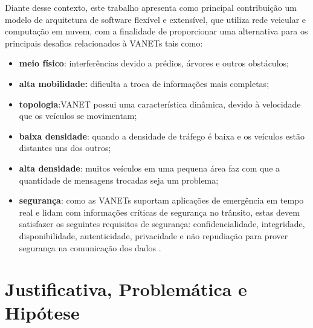 \documentclass[
	12pt,				%
	oneside,			%
	a4paper,			%
	english,			%
	brazil				%
	]{abntex2ppgsi}
\begin{document}
Diante desse contexto, este trabalho apresenta como principal contribuição um modelo de arquitetura de software flexível e extensível, que utiliza rede veicular  e  computação em nuvem, com a finalidade de proporcionar uma alternativa para os principais desafios relacionados à VANETs tais como: 

\begin{itemize}
	\item{\textbf{meio físico}: interferências devido a prédios,  árvores e outros obstáculos;}
	\item{\textbf{alta mobilidade:} dificulta a troca de informações mais completas; }
	\item{\textbf{topologia}:VANET possui uma característica dinâmica, devido à velocidade que os veículos se movimentam;}	
	\item{\textbf{baixa densidade}: quando a densidade de tráfego é baixa e os veículos estão distantes uns dos outros;}
	\item{\textbf{alta densidade}: muitos veículos em uma pequena área faz com que a quantidade de mensagens trocadas seja um problema;}
	\item{\textbf{segurança}: como as VANETs suportam aplicações de emergência em tempo real e lidam com informações	críticas de segurança no trânsito, estas devem satisfazer os seguintes requisitos de segurança: confidencialidade, integridade, disponibilidade, autenticidade, privacidade e não repudiação para prover segurança na comunicação dos dados \cite{samara2010security} \cite{matos2013analise}.}
\end{itemize} 

%


\section{Justificativa, Problemática e Hipótese}
\end{document}
